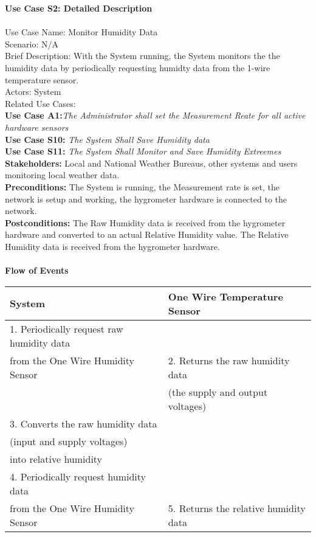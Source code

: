\documentclass[letterpaper]{article}
\begin{document}
\noindent
\textbf{Use Case S2:  Detailed Description}\\\\
Use Case Name:  Monitor Humidity Data\\
Scenario:  N/A\\
Brief Description:  With the System running, the System monitors the
the humidity data by periodically requesting humidty data from the
1-wire temperature sensor.\\
Actors:  System\\
Related Use Cases:\\
\textbf{Use Case A1:}\emph{The Administrator shall set the
Measurement Reate for all active hardware sensors}\\
\textbf{Use Case S10: }\emph{The System Shall Save Humidity data}\\
\textbf{Use Case S11: }\emph{The System Shall Monitor and Save
Humidity Extreemes}\\
\textbf{Stakeholders: } Local and National Weather Bureaus, other
systems and users monitoring local weather data.\\
\textbf{Preconditions:  } The System is running, the Measurement
rate is set, the network is setup and working, the hygrometer 
hardware is connected to the network.\\
\textbf{Postconditions: } The Raw Humidity data is received from the
hygrometer hardware and converted to an actual Relative Humidity
value.  The Relative Humidity data is received from the hygrometer
hardware.\\\\
\textbf{Flow of Events}\\
\begin{tabular}{|l|l|}\hline
\textbf{System} & \textbf{One Wire Temperature Sensor}\\\hline
1.  Periodically request raw humidity data & \\
from the One Wire Humidity Sensor & 2.  Returns the raw humidity
data\\ & (the supply and output voltages)\\\hline
3.  Converts the raw humidity data & \\
(input and supply voltages) & \\into relative humidity & \\\hline
4.  Periodically request humidity data & \\
from the One Wire Humidity Sensor & 5.  Returns the relative
humidity data\\\hline
\end{tabular}\\\\
\end{document}
